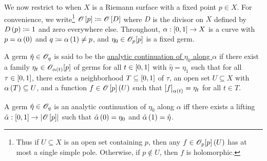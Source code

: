 \documentclass[../Moduli_Spaces_of_Riemann_Surfaces.tex]{subfiles}
\begin{document}
    We now restrict to when $X$ is a Riemann surface with a fixed point $p\in X$. For convenience, we write\footnote{Thus if $U\subseteq X$ is an open set containing $p$, then any $f\in\mathscr{O}_p\!\left[p\right]\left(U\right)$ has at most a single simple pole. Otherwise, if $p\not\in U$, then $f$ is holomorphic.} $\mathscr{O}\left[p\right]\coloneqq\mathscr{O}\left[D\right]$ where $D$ is the divisor on $X$ defined by $D\left(p\right)\coloneqq1$ and zero everywhere else. Throughout, $\alpha:\left[0,1\right]\to X$ is a curve with $p=\alpha\left(0\right)$ and $q\coloneqq\alpha\left(1\right)\neq p$, and $\eta_0\in\mathscr{O}_p\!\left[p\right]$ is a fixed germ.
    \begin{definition}
        A germ $\hat{\eta}\in\mathscr{O}_q$ is said to be the \ul{analytic continuation of $\eta_0$ along $\alpha$} if there exist a family $\eta_t\in\mathscr{O}_{\alpha\left(t\right)}\!\left[p\right]$ of germs for all $t\in\left[0,1\right]$ with $\hat{\eta}=\eta_1$ such that for all $\tau\in\left[0,1\right]$, there exists a neighborhood $T\subseteq\left[0,1\right]$ of $\tau$, an open set $U\subseteq X$ with $\alpha\left(T\right)\subseteq U$, and a function $f\in\mathscr{O}\left[p\right]\left(U\right)$ such that $\left[f\right]_{\alpha\left(t\right)}=\eta_t$ for all $t\in T$.
    \end{definition}
    \begin{proposition}\label{A:prp:analytic_continuation_iff_lifting}
        A germ $\hat{\eta}\in\mathscr{O}_q$ is an analytic continuation of $\eta_0$ along $\alpha$ iff there exists a lifting $\tilde{\alpha}:\left[0,1\right]\to\left|\mathscr{O}\left[p\right]\right|$ such that $\tilde{\alpha}\left(0\right)=\eta_0$ and $\tilde{\alpha}\left(1\right)=\hat{\eta}$.
    \end{proposition}
\end{document}
